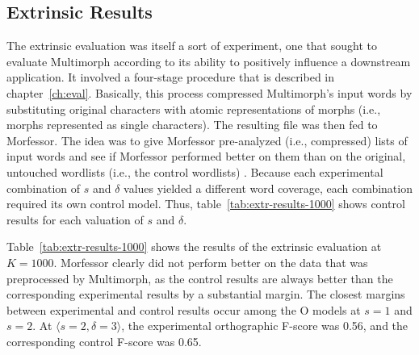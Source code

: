 {%
%


\subsection{Extrinsic Results}
\label{sec:extr-results}
The extrinsic evaluation was itself a sort of experiment, one that sought to evaluate Multimorph according to its 
ability to positively influence a downstream application. It involved a four-stage procedure that is described in 
chapter~\ref{ch:eval}.
Basically, this process compressed Multimorph's input words by substituting original characters with atomic 
representations of morphs (i.e., morphs represented as single characters). The resulting file was then fed to 
Morfessor. The idea was to give Morfessor pre-analyzed (i.e., compressed) lists of input words and
 see if Morfessor performed better on them than on the original, untouched wordlists (i.e., the control wordlists) .
%  
Because each
experimental combination of $s$ and $\delta$ values yielded a different word coverage, 
each combination required its own control model. Thus, table~\ref{tab:extr-results-1000} shows control results for each valuation of $s$ and $\delta$.
 
Table~\ref{tab:extr-results-1000} shows the results of the extrinsic evaluation at $K=1000$. 
Morfessor clearly did not perform 
better on the data that was preprocessed by Multimorph, as the control 
results are always better than the corresponding 
experimental results by a substantial margin. The closest margins between experimental and control results occur among the O models at $s = 1$ and $s = 2$. At $\langle{s}=2,\delta=3\rangle$, the experimental orthographic F-score was 0.56, and the corresponding control F-score was 0.65. 

}
